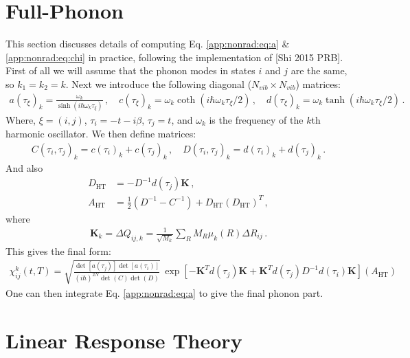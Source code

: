 \section{Full-Phonon}
This section discusses details of computing Eq. \ref{app:nonrad:eq:a} \& \ref{app:nonrad:eq:chi} in practice,  following the implementation of [Shi 2015 PRB]. First of all we will assume that the phonon modes in states $i$ and $j$ are the same, so $k_1 = k_2 = k$. Next we introduce the following diagonal ($N_{vib} \times N_{vib}$) matrices:
\begin{align}
    a(\tau_\xi)_k = \frac{\omega_k}{\sinh{(i\hbar\omega_k\tau_\xi)}}\, , \quad
    c(\tau_\xi)_k = \omega_k\coth{(i\hbar\omega_k\tau_\xi/2)}\, , \quad
    d(\tau_\xi)_k = \omega_k\tanh{(i\hbar\omega_k\tau_\xi/2)}\, .
\end{align}
Where, $\xi = (i,j)$, $\tau_i = -t-i\beta$, $\tau_j = t$, and $\omega_k$ is the frequency of the $k$th harmonic oscillator. We then define matrices:
\begin{align}
    C(\tau_i,\tau_j)_k = c(\tau_i)_k + c(\tau_j)_k\, , \quad
    D(\tau_i,\tau_j)_k = d(\tau_i)_k + d(\tau_j)_k\, .
\end{align}
And also
\begin{align}
    D_\text{HT} &= -D^{-1} d(\tau_j) \textbf{K} \, , \\
    A_\text{HT} &= \frac{1}{2} (D^{-1} - C^{-1}) + D_\text{HT}(D_\text{HT})^T\, ,
\end{align}
where
\begin{align}
    \textbf{K}_k = \Delta Q_{ij,k} = \frac{1}{\sqrt{M_k}} \sum_R M_R \mu_k(R) \Delta R_{ij}\, .
\end{align}
This gives the final form:
\begin{align}
    \chi_{ij}^k(t,T) =
        \sqrt{
            \frac{
                \det{[a(\tau_j)]} \det{[a(\tau_i)]}
            }{
                (i\hbar)^{2N} \det{(C)} \det{(D)}
            }
        }\,
        \exp \left[
            -\textbf{K}^T d(\tau_j)\textbf{K}
            + \textbf{K}^T d(\tau_j) D^{-1} d(\tau_i)\textbf{K}
        \right]
        (A_\text{HT}) \label{app:nonrad:eq:final}
\end{align}
One can then integrate Eq. \ref{app:nonrad:eq:a} to give the final phonon part.


\section{Linear Response Theory}

